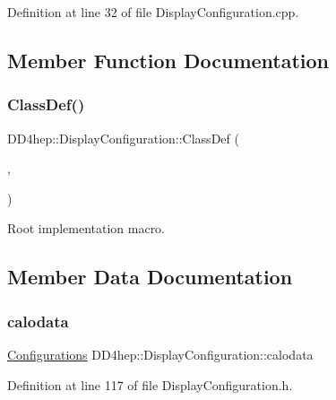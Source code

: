 Definition at line 32 of file Display\+Configuration.\+cpp.



\subsection{Member Function Documentation}
\hypertarget{class_d_d4hep_1_1_display_configuration_a93b904a9305d5666bef3094fb5db6551}{}\label{class_d_d4hep_1_1_display_configuration_a93b904a9305d5666bef3094fb5db6551} 
\subsubsection{\texorpdfstring{Class\+Def()}{ClassDef()}}
{\footnotesize\ttfamily D\+D4hep\+::\+Display\+Configuration\+::\+Class\+Def (\begin{DoxyParamCaption}\item[{\hyperlink{class_d_d4hep_1_1_display_configuration}{Display\+Configuration}}]{,  }\item[{0}]{ }\end{DoxyParamCaption})}



Root implementation macro. 



\subsection{Member Data Documentation}
\hypertarget{class_d_d4hep_1_1_display_configuration_a8ff4fbadd2821a8dbbc0f5006f60357f}{}\label{class_d_d4hep_1_1_display_configuration_a8ff4fbadd2821a8dbbc0f5006f60357f} 
\subsubsection{\texorpdfstring{calodata}{calodata}}
{\footnotesize\ttfamily \hyperlink{class_d_d4hep_1_1_display_configuration_ac43586ae2c70f106cc9027d452d383d7}{Configurations} D\+D4hep\+::\+Display\+Configuration\+::calodata}



Definition at line 117 of file Display\+Configuration.\+h.



